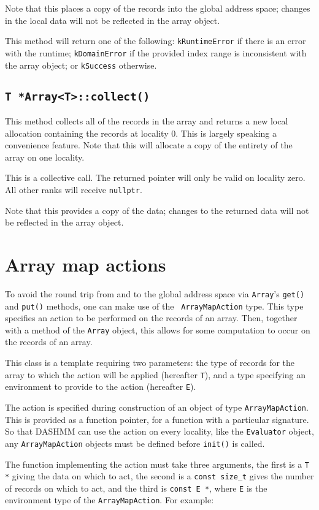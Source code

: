 \documentclass[11pt]{book}
\begin{document}
Note that this places a copy of the records into the global address space;
changes in the local data will not be reflected in the array object.

This method will return one of the following: {\tt kRuntimeError} if there is an
error with the runtime; {\tt kDomainError} if the provided index range is
inconsistent with the array object; or {\tt kSuccess} otherwise.

\subsection{{\tt T *Array<T>::collect()}}

This method collects all of the records in the array and returns a new local
allocation containing the records at locality 0. This is largely speaking a
convenience feature. Note that this will allocate a copy of the entirety of the
array on one locality.

This is a collective call. The returned pointer will only be valid on locality
zero. All other ranks will receive {\tt nullptr}.

Note that this provides a copy of the data; changes to the returned data will
not be reflected in the array object.

\section{Array map actions}

To avoid the round trip from and to the global address space via {\tt Array}'s
{\tt get()} and {\tt put()} methods, one can make use of the {\tt
  ArrayMapAction}  type.
This type specifies an action to be performed on the records of an array.
Then, together with a method of the {\tt Array} object, this allows for
some computation to occur on the records of an array.

This class is a template requiring two parameters: the type of records for
the array to which the action will be applied (hereafter {\tt T}), and a type
specifying an environment to provide to the action (hereafter {\tt E}).

The action is specified during construction of an object of type
{\tt ArrayMapAction}. This is provided as a function pointer, for a function
with a particular signature. So that DASHMM can use the action on every
locality, like the {\tt Evaluator} object, any {\tt ArrayMapAction} objects must
be defined before {\tt init()} is called.

The function implementing the action must take three arguments, the first is
a {\tt T *} giving the data on which to act, the second is a {\tt const size\_t}
gives the number of records on which to act, and the third is {\tt const E *},
where {\tt E} is the environment type of the {\tt ArrayMapAction}. For example:
\end{document}
